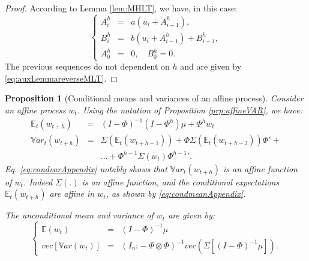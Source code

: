 \documentclass[
  12pt,
]{book}
\newtheorem{proposition}{Proposition}[chapter]
\theoremstyle{definition}
\theoremstyle{definition}
\theoremstyle{definition}
\theoremstyle{definition}
\theoremstyle{remark}
\begin{document}
\begin{proof}
According to Lemma \ref{lem:MHLT}, we have, in this case:
\[
\left\{
\begin{array}{ccl}
A^h_{i} &=& a(u_{i} + A^h_{i-1}), \\
B^h_{i} &=& b(u_{i} + A^h_{i-1}) + B^h_{i-1}, \\
A^h_{0} &=& 0, \quad B^h_{0} = 0.
\end{array}
\right.
\]
The previous sequences do not dependent on \(h\) and are given by \eqref{eq:auxLemmareverseMLT}.
\end{proof}

\begin{proposition}[Conditional means and variances of an affine process]
\protect\hypertarget{prp:condvarAffine}{}\label{prp:condvarAffine}Consider an affine process \(w_t\). Using the notation of Proposition \ref{prp:affineVAR}, we have:
\begin{eqnarray}
\mathbb{E}_t(w_{t+h}) &=& (I - \Phi)^{-1}(I - \Phi^h)\mu + \Phi^h w_t \label{eq:condmeanAppendix}\\
\mathbb{V}ar_t(w_{t+h}) &=& \Sigma(\mathbb{E}_t(w_{t+h-1}))+\Phi \Sigma(\mathbb{E}_t(w_{t+h-2}))\Phi' + \nonumber \\
&& \dots + \Phi^{h-1} \Sigma(w_{t}){\Phi^{h-1}}'. \label{eq:condvarAppendix}
\end{eqnarray}
Eq. \eqref{eq:condvarAppendix} notably shows that \(\mathbb{V}ar_t(w_{t+h})\) is an affine function of \(w_t\). Indeed \(\Sigma(.)\) is an affine function, and the conditional expectations \(\mathbb{E}_t(w_{t+h})\) are affine in \(w_t\), as shown by \eqref{eq:condmeanAppendix}.

The unconditional mean and variance of \(w_t\) are given by:
\begin{equation}
\left\{
\begin{array}{ccl}
\mathbb{E}(w_t) &=& (I - \Phi)^{-1}\mu\\
vec[\mathbb{V}ar(w_t)] &=& (I_{n^2} - \Phi \otimes \Phi)^{-1} vec\left(\Sigma[(I - \Phi)^{-1}\mu]\right).
\end{array}
\right.\label{eq:uncondmeanvarAppendix}
\end{equation}
\end{proposition}
\end{document}
